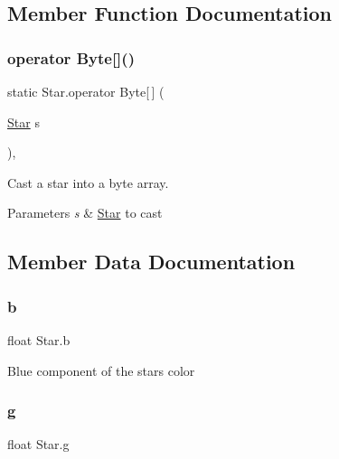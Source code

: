 \subsection{Member Function Documentation}
\mbox{\label{struct_star_a59ba9ab515e5fbd80be0b6cbef8a450a}} 
\subsubsection{\texorpdfstring{operator Byte[]()}{operator Byte[]()}}
{\footnotesize\ttfamily static Star.\+operator Byte\mbox{[}$\,$\mbox{]} (\begin{DoxyParamCaption}\item[{\mbox{\hyperlink{struct_star}{Star}}}]{s }\end{DoxyParamCaption})\hspace{0.3cm}{\ttfamily [explicit]}, {\ttfamily [static]}}



Cast a star into a byte array. 


\begin{DoxyParams}{Parameters}
{\em s} & \mbox{\hyperlink{struct_star}{Star}} to cast\\
\hline
\end{DoxyParams}


\subsection{Member Data Documentation}
\mbox{\label{struct_star_a3469c5e78552834a63b5d4566ff5bdd7}} 
\subsubsection{\texorpdfstring{b}{b}}
{\footnotesize\ttfamily float Star.\+b}



Blue component of the star\textquotesingle{}s color 

\mbox{\label{struct_star_ad9034f40a9923febb7596b06258278c8}} 
\subsubsection{\texorpdfstring{g}{g}}
{\footnotesize\ttfamily float Star.\+g}



